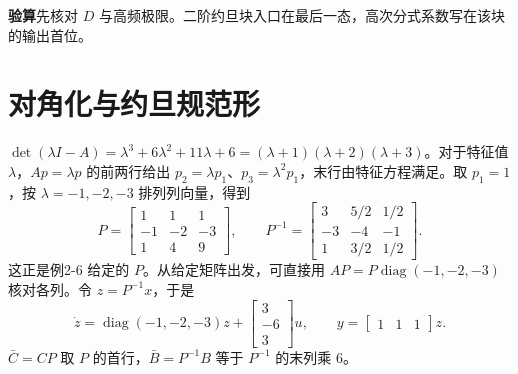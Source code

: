 \noindent\textbf{验算}\quad 先核对 $D$ 与高频极限。二阶约旦块入口在最后一态，高次分式系数写在该块的输出首位。

\section{对角化与约旦规范形}



\sol $\det(\lambda I-A)=\lambda^3+6\lambda^2+11\lambda+6=(\lambda+1)(\lambda+2)(\lambda+3)$。对于特征值 $\lambda$，$Ap=\lambda p$ 的前两行给出 $p_2=\lambda p_1$、$p_3=\lambda^2p_1$，末行由特征方程满足。取 $p_1=1$，按 $\lambda=-1,-2,-3$ 排列列向量，得到
\[
P=\begin{bmatrix}1&1&1\\-1&-2&-3\\1&4&9\end{bmatrix},\qquad
P^{-1}=\begin{bmatrix}3&5/2&1/2\\-3&-4&-1\\1&3/2&1/2\end{bmatrix}.
\]
这正是例2-6 给定的 $P$。从给定矩阵出发，可直接用 $AP=P\operatorname{diag}(-1,-2,-3)$ 核对各列。令 $z=P^{-1}x$，于是
\[
\dot z=\operatorname{diag}(-1,-2,-3)z+
\begin{bmatrix}3\\-6\\3\end{bmatrix}u,\qquad
y=\begin{bmatrix}1&1&1\end{bmatrix}z.
\]
$\bar C=CP$ 取 $P$ 的首行，$\bar B=P^{-1}B$ 等于 $P^{-1}$ 的末列乘 6。

